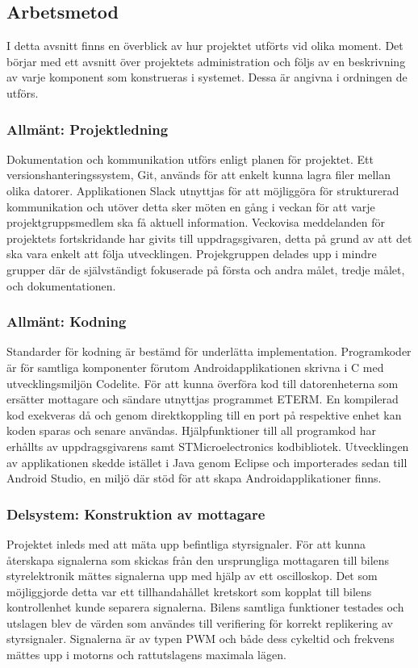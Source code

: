 \documentclass[a4paper]{article}
\begin{document}
\subsection{Arbetsmetod}
I detta avsnitt finns en överblick av hur projektet utförts vid olika moment. Det börjar med ett avsnitt över projektets administration och följs av en beskrivning av varje komponent som konstrueras i systemet. Dessa är angivna i ordningen de utförs.

\subsubsection{Allmänt: Projektledning}
Dokumentation och kommunikation utförs enligt planen för projektet. Ett versionshanteringssystem, Git, används för att enkelt kunna lagra filer mellan olika datorer. Applikationen Slack utnyttjas för att möjliggöra för strukturerad kommunikation och utöver detta sker möten en gång i veckan för att varje projektgruppsmedlem ska få aktuell information. Veckovisa meddelanden för projektets fortskridande har givits till uppdragsgivaren, detta på grund av att det ska vara enkelt att följa utvecklingen. Projekgruppen delades upp i mindre grupper där de självständigt fokuserade på första och andra målet, tredje målet, och dokumentationen.

\subsubsection{Allmänt: Kodning}
Standarder för kodning är bestämd för underlätta implementation. Programkoder är för samtliga komponenter förutom Androidapplikationen skrivna i C med utvecklingsmiljön Codelite.  För att kunna överföra kod till datorenheterna som ersätter mottagare och sändare utnyttjas programmet ETERM. En kompilerad kod exekveras då och genom direktkoppling till en port på respektive enhet kan koden sparas och senare användas. Hjälpfunktioner till all programkod har erhållts av uppdragsgivarens samt STMicroelectronics kodbibliotek. Utvecklingen av applikationen skedde istället i Java genom Eclipse och importerades sedan till Android Studio, en miljö där stöd för att skapa Androidapplikationer finns.


\subsubsection{Delsystem: Konstruktion av mottagare}
Projektet inleds med att mäta upp befintliga styrsignaler. För att kunna återskapa signalerna som skickas från den ursprungliga mottagaren till bilens styrelektronik mättes signalerna upp med hjälp av ett oscilloskop. Det som möjliggjorde detta var ett tillhandahållet kretskort som kopplat till bilens kontrollenhet kunde separera signalerna. Bilens samtliga funktioner testades och utslagen blev de värden som användes till verifiering för korrekt replikering av styrsignaler. Signalerna är av typen PWM och både dess cykeltid och frekvens mättes upp i motorns och rattutslagens maximala lägen. 
\end{document}
